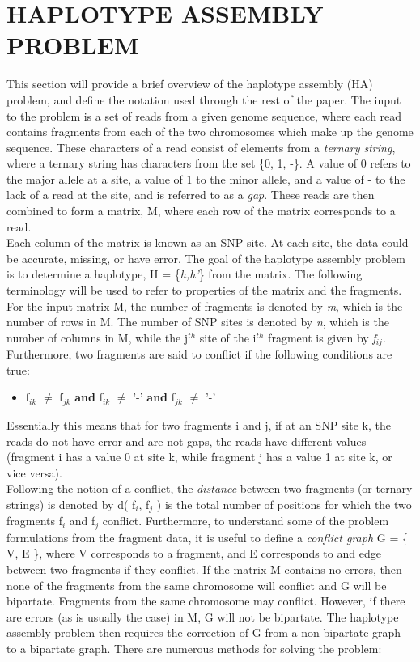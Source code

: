 \documentclass[10pt,twocolumn]{witseiepaper}
\begin{document}
\section{HAPLOTYPE ASSEMBLY PROBLEM} \label{sec:hap}

This section will provide a brief overview of the haplotype assembly (HA) problem, and define the
notation used through the rest of the paper. The input to the problem is a set of reads from a given genome
sequence, where each read contains fragments from each of the two chromosomes which make up the genome
sequence. These characters of a read consist of elements from a \textit{ternary string}, where a ternary
string has characters from the set \{0, 1, -\}. A value of 0 refers to the major allele
at a site, a value of 1 to the minor allele, and a value of - to the lack of a read at the site, and is
referred to as a \textit{gap}. These reads are then combined to form a matrix, M, where each row of the 
matrix corresponds to a read. \\
Each column of the matrix is known as an SNP site. At each site, the data could be accurate, missing, or have
error. The goal of the haplotype assembly problem is to determine a haplotype, H = \{\textit{h,h'}\}
from the matrix. The following terminology will be used to refer to properties of the matrix and the
fragments. \\
For the input matrix M, the number of fragments is denoted by \textit{m}, which is the number of rows in M.
The number of SNP sites is denoted by \textit{n}, which is the number of columns in M, while the j$^{th}$ 
site of the i$^{th}$ fragment is given by \textit{f$_{ij}$}. Furthermore, two fragments are said to 
conflict if the following conditions are true:
\begin{itemize}
    \item{f$_{ik}$ $\neq$ f$_{jk}$ \textbf{and} f$_{ik}$ $\neq$ '-' \textbf{and} f$_{jk}$ $\neq$ '-' }
\end{itemize}
Essentially this means that for two fragments i and j, if at an SNP site k, the reads do not have error and are 
not gaps, the reads have different values (fragment i has a value 0 at site k, while fragment j has a value 
1 at site k, or vice versa). \\
Following the notion of a conflict, the \textit{distance} between two fragments (or ternary strings) is
denoted by d( f$_i$, f$_j$ ) is the total number of positions for which the two fragments f$_i$ and f$_j$
conflict. Furthermore, to understand some of the problem formulations from the fragment data, it is useful to
define a \textit{conflict graph} \cite{lancia:2001} G = \{ V, E \}, where V corresponds to a fragment, and E
corresponds to and edge between two fragments if they conflict. If the matrix M contains no errors, then none
of the fragments from the same chromosome will conflict and G will be bipartate. Fragments from the same
chromosome may conflict. However, if there are errors (as is usually the case) in M, G will not be
bipartate. The haplotype assembly problem then requires the correction of G from a non-bipartate 
graph to a bipartate graph. There are numerous methods for solving the problem:
\end{document}
